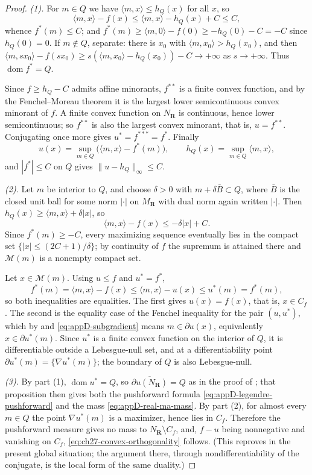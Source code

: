 \begin{proof}
\emph{(1).}  For $m\in Q$ we have $\langle m,x\rangle\leq h_Q(x)$ for all
$x$, so
\[
 \langle m,x\rangle-f(x)\leq\langle m,x\rangle-h_Q(x)+C\leq C,
\]
whence $f^*(m)\leq C$; and $f^*(m)\geq\langle m,0\rangle-f(0)\geq
-h_Q(0)-C=-C$ since $h_Q(0)=0$.  If $m\notin Q$, separate: there is
$x_0$ with $\langle m,x_0\rangle>h_Q(x_0)$, and then
$\langle m,sx_0\rangle-f(sx_0)\geq
s(\langle m,x_0\rangle-h_Q(x_0))-C\to+\infty$ as $s\to+\infty$.  Thus
$\operatorname{dom}f^*=Q$.

Since $f\geq h_Q-C$ admits affine minorants, $f^{**}$ is a finite convex
function, and by the Fenchel--Moreau theorem
 it is the largest lower semicontinuous convex
minorant of $f$.  A finite convex function on $N_{\mathbf R}$ is
continuous, hence lower semicontinuous; so $f^{**}$ is also the largest
convex minorant, that is, $u=f^{**}$.  Conjugating once more gives
$u^*=f^{***}=f^*$.  Finally
\[
 u(x)=\sup_{m\in Q}\bigl(\langle m,x\rangle-f^*(m)\bigr),
 \qquad
 h_Q(x)=\sup_{m\in Q}\langle m,x\rangle,
\]
and $|f^*|\leq C$ on $Q$ gives
$\lVert u-h_Q\rVert_\infty\leq C$.

\emph{(2).}  Let $m$ be interior to $Q$, and choose $\delta>0$ with
$m+\delta \bar B\subset Q$, where $\bar B$ is the closed unit ball for
some norm $|\cdot|$ on $M_{\mathbf R}$ with dual norm again written
$|\cdot|$.  Then $h_Q(x)\geq\langle m,x\rangle+\delta|x|$, so
\[
 \langle m,x\rangle-f(x)\leq-\delta|x|+C .
\]
Since $f^*(m)\geq-C$, every maximizing sequence eventually lies in the
compact set $\{|x|\leq(2C+1)/\delta\}$; by continuity of $f$ the supremum is
attained there and $\mathcal M(m)$ is a nonempty compact set.

Let $x\in\mathcal M(m)$.  Using $u\leq f$ and $u^*=f^*$,
\[
 f^*(m)=\langle m,x\rangle-f(x)
       \leq\langle m,x\rangle-u(x)
       \leq u^*(m)=f^*(m),
\]
so both inequalities are equalities.  The first gives $u(x)=f(x)$, that is,
$x\in C_f$.  The second is the equality case of the Fenchel inequality for
the pair $(u,u^*)$, which by
 and \eqref{eq:appD-subgradient} means
$m\in\partial u(x)$, equivalently $x\in\partial u^*(m)$.  Since $u^*$
is a finite convex function on the interior of $Q$, it is differentiable
outside a Lebesgue-null set, and at a differentiability point
$\partial u^*(m)=\{\nabla u^*(m)\}$; the boundary of $Q$ is also
Lebesgue-null.

\emph{(3).}  By part (1), $\operatorname{dom}u^*=Q$, so
$\overline{\partial u(N_{\mathbf R})}=Q$ as in the proof of
; that proposition then gives both the
pushforward formula \eqref{eq:appD-legendre-pushforward} and the mass
\eqref{eq:appD-real-ma-mass}.  By part (2), for almost every $m\in Q$ the
point $\nabla u^*(m)$ is a maximizer, hence lies in $C_f$.  Therefore
the pushforward measure gives no mass to $N_{\mathbf R}\setminus C_f$,
and, $f-u$ being nonnegative and vanishing on $C_f$,
\eqref{eq:ch27-convex-orthogonality} follows.  (This reproves
 in the present global
situation; the argument there, through nondifferentiability of the
conjugate, is the local form of the same duality.)


\end{proof}
